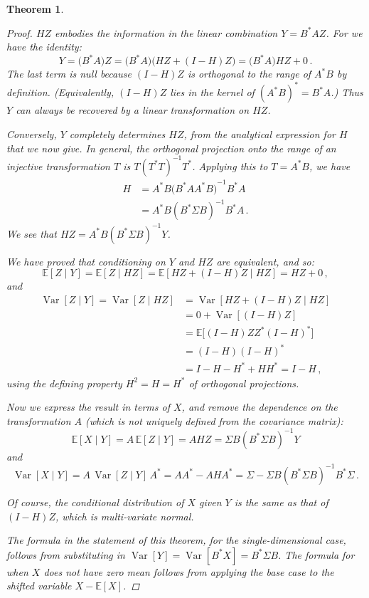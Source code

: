\documentclass[12pt]{article}
\newtheorem*{thm*}{Theorem}
\newcommand{\inv}[1]{{#1}^{-1}}
\newcommand{\TR}[1]{#1^{\ast}}
\DeclareMathOperator{\Var}{Var}
\newcommand{\E}{\mathbb{E}}
\begin{document}
\begin{thm*}
\begin{proof}
$HZ$ embodies the information in the linear combination $Y = \TR{B}AZ$.
For we have the identity:
\[
Y = \bigl( \TR{B}A \bigr) Z = \bigl( \TR{B}A \bigr) \bigl( HZ + (I-H)Z \bigr) 
= \bigl( \TR{B}A \bigr) HZ + 0\,.
\]
The last term is null because $(I-H)Z$ is orthogonal to the range of $\TR{A}B$
by definition.  (Equivalently, $(I-H)Z$ lies in the kernel of $\TR{(\TR{A} B)} = \TR{B} A$.)
Thus $Y$ can always be recovered by a linear transformation on 
$HZ$.

Conversely, $Y$ completely determines $HZ$,
from the analytical expression for $H$ that we now give.
In general, the orthogonal projection onto the range of an injective 
transformation $T$
is $T \inv{(\TR{T} T)} \TR{T}$.  Applying this to $T = \TR{A}B$, we have
\begin{align*}
H &= \TR{A} B \inv{\bigl( \TR{B} A \TR{A} B \bigr)} \TR{B} A \\
&= \TR{A} B \inv{(\TR{B} \Sigma B)} \TR{B} A \,.
\end{align*}
We see that $HZ = \TR{A} B \inv{ (\TR{B} \Sigma B) } Y$.

We have proved that conditioning on $Y$ and $HZ$ are equivalent, and so:
\[
\E[Z \mid Y] = \E[Z \mid HZ] = \E[HZ + (I-H)Z \mid HZ] = HZ + 0\,, 
\]
and
\begin{align*}
\Var[Z \mid Y] = \Var[Z \mid HZ] &= \Var[HZ + (I-H)Z \mid HZ] \\
&= 0 + \Var[(I-H)Z ] \\
&= \E\bigl[ (I-H)Z \TR{Z} \TR{(I-H)} \bigr] \\
&= (I-H) \TR{(I-H)} \\
&= I-H -\TR{H} + H\TR{H} = I-H\,,
\end{align*}
using the defining property 
$H^2 = H = \TR{H}$
of orthogonal projections.

Now we express the result in terms of $X$, and remove the dependence on the transformation $A$
(which is not uniquely defined from the covariance matrix):
\[
\E[X \mid Y] = A \, \E[Z \mid Y] = AHZ = 
\Sigma B \inv{(\TR{B} \Sigma B)} Y
\]
and
\[
\Var[X \mid Y] = A \, \Var[Z \mid Y] \, \TR{A}
= A \TR{A} - A H \TR{A} 
= \Sigma - \Sigma B \inv{(\TR{B} \Sigma B)}  \TR{B} \Sigma\,.
\]

Of course, the conditional distribution of $X$ given $Y$ is the same
as that of $(I-H)Z$, which is multi-variate normal.

The formula in the statement of this theorem, for the single-dimensional case,
follows from substituting in $\Var[Y] = \Var[\TR{B}X] = \TR{B} \Sigma B$.
The formula for when $X$ does not have zero
mean follows from applying the base case to the shifted 
variable $X - \E[X]$.
\end{proof}
\end{thm*}

\end{document}
